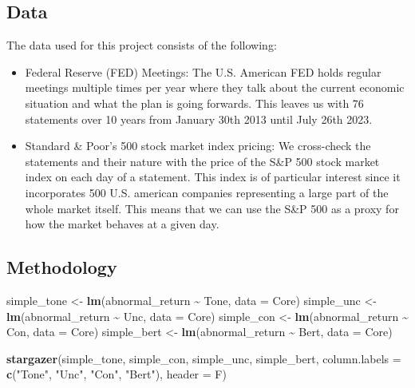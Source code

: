 \documentclass[
]{article}
\newenvironment{Shaded}{\begin{snugshade}}{\end{snugshade}}
\newcommand{\AttributeTok}[1]{\textcolor[rgb]{0.13,0.29,0.53}{#1}}
\newcommand{\FunctionTok}[1]{\textcolor[rgb]{0.13,0.29,0.53}{\textbf{#1}}}
\newcommand{\NormalTok}[1]{#1}
\newcommand{\OtherTok}[1]{\textcolor[rgb]{0.56,0.35,0.01}{#1}}
\newcommand{\SpecialCharTok}[1]{\textcolor[rgb]{0.81,0.36,0.00}{\textbf{#1}}}
\newcommand{\StringTok}[1]{\textcolor[rgb]{0.31,0.60,0.02}{#1}}
\begin{document}
\hypertarget{sec-data}{%
\subsection{Data}\label{sec-data}}

The data used for this project consists of the following:

\begin{itemize}
\item
  Federal Reserve (FED) Meetings: The U.S. American FED holds regular
  meetings multiple times per year where they talk about the current
  economic situation and what the plan is going forwards. This leaves us
  with 76 statements over 10 years from January 30th 2013 until July
  26th 2023.
\item
  Standard \& Poor's 500 stock market index pricing: We cross-check the
  statements and their nature with the price of the S\&P 500 stock
  market index on each day of a statement. This index is of particular
  interest since it incorporates 500 U.S. american companies
  representing a large part of the whole market itself. This means that
  we can use the S\&P 500 as a proxy for how the market behaves at a
  given day.
\end{itemize}

\hypertarget{sec-methodology}{%
\subsection{Methodology}\label{sec-methodology}}

\begin{Shaded}
\begin{Highlighting}[]
\NormalTok{simple\_tone }\OtherTok{\textless{}{-}} \FunctionTok{lm}\NormalTok{(abnormal\_return }\SpecialCharTok{\textasciitilde{}}\NormalTok{ Tone, }\AttributeTok{data =}\NormalTok{ Core)}
\NormalTok{simple\_unc }\OtherTok{\textless{}{-}} \FunctionTok{lm}\NormalTok{(abnormal\_return }\SpecialCharTok{\textasciitilde{}}\NormalTok{ Unc, }\AttributeTok{data =}\NormalTok{ Core)}
\NormalTok{simple\_con }\OtherTok{\textless{}{-}} \FunctionTok{lm}\NormalTok{(abnormal\_return }\SpecialCharTok{\textasciitilde{}}\NormalTok{ Con, }\AttributeTok{data =}\NormalTok{ Core)}
\NormalTok{simple\_bert }\OtherTok{\textless{}{-}} \FunctionTok{lm}\NormalTok{(abnormal\_return }\SpecialCharTok{\textasciitilde{}}\NormalTok{ Bert, }\AttributeTok{data =}\NormalTok{ Core)}

\FunctionTok{stargazer}\NormalTok{(simple\_tone, simple\_con, simple\_unc, simple\_bert, }\AttributeTok{column.labels =} \FunctionTok{c}\NormalTok{(}\StringTok{"Tone"}\NormalTok{, }\StringTok{"Unc"}\NormalTok{, }\StringTok{"Con"}\NormalTok{, }\StringTok{"Bert"}\NormalTok{), }\AttributeTok{header =}\NormalTok{ F)}
\end{Highlighting}
\end{Shaded}
\end{document}
